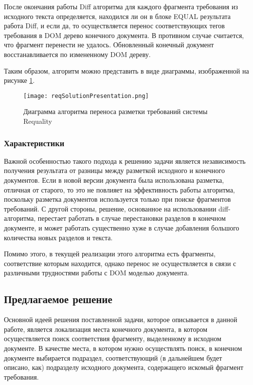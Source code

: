После окончания работы Diff алгоритма для каждого фрагмента требования из исходного текста определяется, находился ли он в блоке EQUAL результата работа Diff, и если да, то осуществляется перенос соответствующих тегов требования в DOM дерево конечного документа. В противном случае считается, что фрагмент перенести не удалось. Обновленный конечный документ восстанавливается по измененному DOM дереву.

Таким образом, алгоритм можно представить в виде диаграммы, изображенной на рисунке \ref{pr:image6}.

\begin{figure}[h]
\begin{center}
\texttt{[image: reqSolutionPresentation.png]}
\caption{Диаграмма алгоритма переноса разметки требований системы Requality}
\label{pr:image6}
\end{center}
\end{figure}

\subsubsection{Характеристики}

Важной особенностью такого подхода к решению задачи является независимость получения результата от разницы между разметкой исходного и конечного документов. Если в новой версии документа была использована разметка, отличная от старого, то это не повлияет на эффективность работы алгоритма, поскольку разметка документов используется только при поиске фрагментов требований. С другой стороны, решение, основанное на использовании diff-алгоритма, перестает работать в случае перестановки разделов в конечном документе, и может работать существенно хуже в случае добавления большого количества новых разделов и текста.

Помимо этого, в текущей реализации этого алгоритма есть фрагменты, соответствие которым находится, однако перенос не осуществляется в связи с различными трудностями работы с DOM моделью документа.

\subsection{Предлагаемое решение}

Основной идеей решения поставленной задачи, которое описывается в данной работе, является локализация места конечного документа, в котором осуществляется поиск соответствия фрагменту, выделенному в исходном документе. В качестве места, в котором нужно осуществлять поиск, в конечном документе выбирается подраздел, соответствующий (в дальнейшем будет описано, как) подразделу исходного документа, содержащего искомый фрагмент требования.

